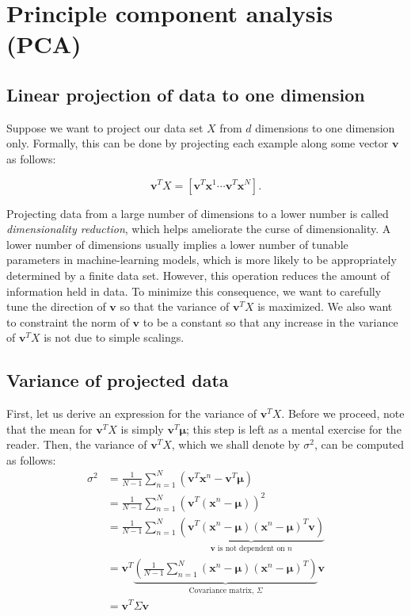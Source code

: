 \documentclass{article}
\newcommand{\vecv}{\boldsymbol{v}}
\newcommand{\vecx}{\boldsymbol{x}}
\begin{document}
\section{Principle component analysis (PCA)}

\subsection{Linear projection of data to one dimension}

Suppose we want to project our data set $X$ from $d$ dimensions to one dimension only. Formally, this can be done by projecting each example along some vector $\vecv$ as follows:

$$\vecv^T X = [ \vecv^T \vecx^1 \cdots \vecv^T \vecx^N ].$$

Projecting data from a large number of dimensions to a lower number is called \textit{dimensionality reduction}, which helps ameliorate the curse of dimensionality. A lower number of dimensions usually implies a lower number of tunable parameters in machine-learning models, which is more likely to be appropriately determined by a finite data set. However, this operation reduces the amount of information held in data. To minimize this consequence, we want to carefully tune the direction of $\vecv$ so that the variance of $\vecv^T X$ is maximized. We also want to constraint the norm of $\vecv$ to be a constant so that any increase in the variance of $\vecv^T X$ is not due to simple scalings.

\subsection{Variance of projected data}

First, let us derive an expression for the variance of $\vecv^T X$. Before we proceed, note that the mean for $\vecv^T X$ is simply $\vecv^T \boldsymbol{\mu}$; this step is left as a mental exercise for the reader. Then, the variance of $\vecv^T X$, which we shall denote by $\sigma^2$, can be computed as follows:
\begin{align*}
\sigma^2 &= \frac{1}{N-1} \sum_{n=1}^{N} (\vecv^T \vecx^n - \vecv^T \boldsymbol{\mu}) \\
&=  \frac{1}{N-1} \sum_{n=1}^{N} (\vecv^T (\vecx^n - \boldsymbol{\mu}))^2 \\
&= \frac{1}{N-1} \sum_{n=1}^{N} 
\underbrace{
	(\vecv^T (\vecx^n - \boldsymbol{\mu})(\vecx^n - \boldsymbol{\mu})^T \vecv)
}_{\vecv \text{ is not dependent on } n} \\
&= \vecv^T 
\underbrace{
	\left( \frac{1}{N-1} \sum_{n=1}^{N}  (\vecx^n - \boldsymbol{\mu})(\vecx^n - \boldsymbol{\mu})^T  \right) 
}_{\text{Covariance matrix, } \Sigma}
\vecv \\
& = \vecv^T \Sigma \vecv
\end{align*}
\end{document}
